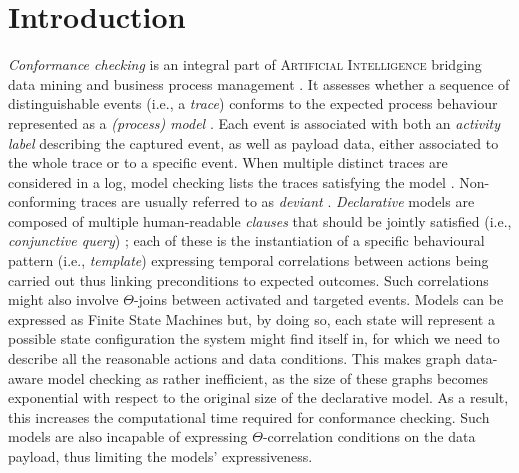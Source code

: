 \section{Introduction}

\textit{Conformance checking} is an integral part of \textsc{Artificial Intelligence} {bridging} data mining and business process management \cite{bpm21}. It assesses whether a sequence of distinguishable events (i.e., a \textit{trace}) conforms to the expected process behaviour represented as a \textit{(process) model} \cite{RozinatA08}. Each event is associated with both an \textit{activity label} describing the captured event, as well as payload data, either associated to the whole trace or to a specific event. When multiple distinct traces are considered in a log, model checking lists the %
 traces satisfying the model \cite{BurattinMS16}. Non-conforming traces  are usually referred to as \textit{deviant} \cite{bpm21}.  \textit{Declarative} models are composed of multiple human-readable \textit{clauses} that should be  jointly satisfied (i.e., \textit{conjunctive query}) \cite{Li2020}; each of these is the instantiation of a specific behavioural pattern (i.e., \textit{template}) expressing temporal correlations between actions being carried out thus linking preconditions to expected outcomes. Such correlations might  also involve %
  $\Theta$-joins between activated and targeted events. %
 Models
 can be %
 expressed as Finite State Machines \cite{MultiPerspective,AgostinelliBFMM21} %
 but, by doing so, each state will represent a possible state configuration the system might find itself in, for which we need to describe all the reasonable actions and data conditions. %
 This makes graph data-aware model checking as \cite{bpm21} rather inefficient, as the size of these graphs becomes exponential with respect to the original size of the declarative model. As a result, this increases the computational time required for conformance checking. Such models are also incapable of expressing $\Theta$-correlation conditions on the data payload, thus limiting the models' expressiveness.
 
